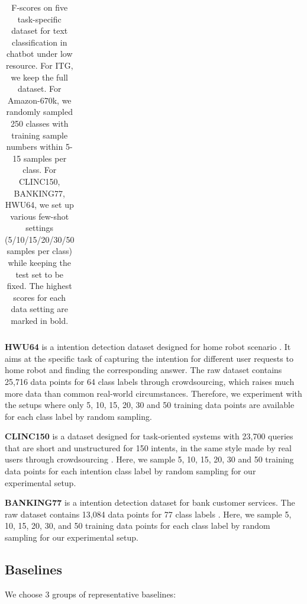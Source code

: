 \documentclass[letterpaper]{article} %
\providecommand{\tabularnewline}{\\}
\begin{document}
\begin{table}
\begin{centering}
{\begin{tabular}{|c|cccccc|cccccc|cccccc|c|c|}
          & & & & & & & & & & & & & & & & & & & &\tabularnewline
          \hline
        \end{tabular}
      }
      \par
    \end{centering}
    \caption{
        F-scores on five task-specific dataset for text classification in chatbot under low resource. For ITG, we keep the full dataset. For Amazon-670k, we randomly sampled 250 classes with training sample numbers within 5-15 samples per class. For CLINC150, BANKING77, HWU64, we set up various few-shot settings (5/10/15/20/30/50 samples per class) while keeping the test set to be fixed. The highest scores for each data setting are marked in bold.
    }
    \label{tbe:table2}
  \end{table}

  \textbf{HWU64}   is  a  intention  detection  dataset  designed  for  home  robot
  scenario \cite{liu2019benchmarking}.  It aims at the specific task of capturing
  the  intention  for  different  user  requests  to  home  robot  and  finding the
  corresponding answer. The raw dataset contains 25,716 data points for 64 class
  labels  through  crowdsourcing,  which  raises  much  more  data  than  common
  real-world  circumstances. Therefore, we experiment with the setups where only
  5,  10,  15, 20, 30 and 50 training data points are available for each class label by
  random sampling.

  \textbf{CLINC150}  is a dataset designed for task-oriented systems with 23,700
  queries  that  are  short  and unstructured for 150 intents, in the same style
  made  by real users through crowdsourcing \cite{larson2019evaluation}. Here, we
  sample 5, 10, 15, 20, 30 and 50 training data points for each intention class label by random
  sampling for our experimental setup.

  \textbf{BANKING77}  is  a intention detection dataset for bank customer services.
  The    raw    dataset    contains    13,084   data   points   for   77   class
  labels \cite{casanueva2020efficient}.  Here,  we  sample 5, 10, 15, 20, 30, and 50 training
  data  points  for  each  class  label  by random sampling for our experimental
  setup.


  \subsection{Baselines}
  We choose 3 groups of representative baselines:
\end{document}
